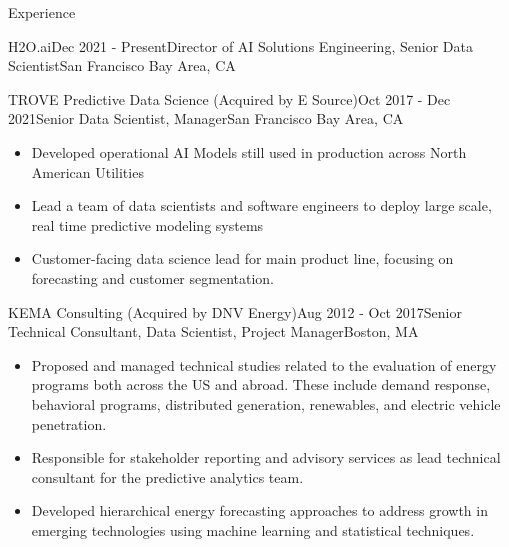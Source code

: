 \documentclass{resume} %
\begin{document}
\begin{rSection}{Experience}
\begin{rSubsection}{H2O.ai}{Dec 2021 - Present}{Director of AI Solutions Engineering, Senior Data Scientist}{San Francisco Bay Area, CA}
\begin{itemize}
\end{itemize}


\end{rSubsection}
\begin{rSubsection}{TROVE Predictive Data Science (Acquired by E Source)}{Oct 2017 - Dec 2021}{Senior Data Scientist, Manager}{San Francisco Bay Area, CA}
\begin{itemize}
	\item Developed operational AI Models still used in production across North American Utilities
	\item Lead a team of data scientists and software engineers to deploy large scale, real time predictive modeling systems
	\item Customer-facing data science lead for main product line, focusing on forecasting and customer segmentation.
\end{itemize}
\end{rSubsection}


\begin{rSubsection}{KEMA Consulting (Acquired by DNV Energy)}{Aug 2012 - Oct 2017}{Senior Technical Consultant, Data Scientist, Project Manager}{Boston, MA}
\begin{itemize}
\item Proposed and managed technical studies related to the evaluation of energy programs both across the US and abroad. These include demand response, behavioral programs, distributed generation, renewables, and electric vehicle  penetration.
\item Responsible for stakeholder reporting and advisory services as lead technical consultant for the  predictive analytics team.
\item Developed hierarchical energy forecasting approaches to address growth in emerging technologies using machine learning and statistical techniques.
\end{itemize}
\end{rSubsection}


\end{rSection}
\end{document}
